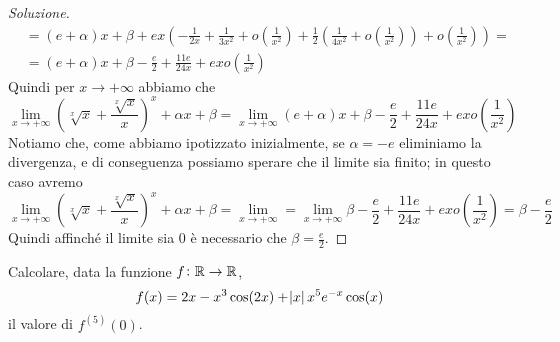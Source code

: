 \begin{proof}[Soluzione]
\[\begin{split}
        & = (e+\alpha)x + \beta +ex\left(-\frac{1}{2x}+\frac{1}{3x^2}+o\left(\frac{1}{x^2}\right) + \frac{1}{2}\left(\frac{1}{4x^2} +o\left(\frac{1}{x^2}\right)\right)+o\left(\frac{1}{x^2}\right)\right) = \\
        & = (e+\alpha)x + \beta  -\frac{e}{2}+ \frac{11e}{24x}+ex o\left(\frac{1}{x^2}\right)
    \end{split}
    \]
    Quindi per $x\to +\infty$ abbiamo che
    \[
    \lim_{x\to +\infty} \left(\sqrt[x]{x} + \frac{\sqrt[x]{x}}{x}\right)^x+\alpha x + \beta = \lim_{x\to+\infty}  (e+\alpha)x + \beta  -\frac{e}{2}+ \frac{11e}{24x}+ex o\left(\frac{1}{x^2}\right) 
    \]
    Notiamo che, come abbiamo ipotizzato inizialmente, se $\alpha = -e$ eliminiamo la divergenza, e di conseguenza possiamo sperare che il limite sia finito; in questo caso avremo
    \[
    \lim_{x\to +\infty} \left(\sqrt[x]{x} + \frac{\sqrt[x]{x}}{x}\right)^x+\alpha x + \beta = \lim_{x\to+\infty} = \lim_{x\to+\infty}  \beta  -\frac{e}{2}+ \frac{11e}{24x}+ex o\left(\frac{1}{x^2}\right) = \beta -\frac{e}{2}
    \]
    Quindi affinché il limite sia $0$ è necessario che $\beta = \frac{e}{2}$.
\end{proof}
\begin{exercise}
    \label{ex:6.8}
    Calcolare, data la funzione $f\colon \amsbb{R}\to \amsbb{R}$,
    \[
    f(x) = 2x-x^3\cos(2x)+\abs{x}x^5 e^{-x} \cos(x)
    \]
    il valore di $f^{(5)}(0)$.
\end{exercise}
